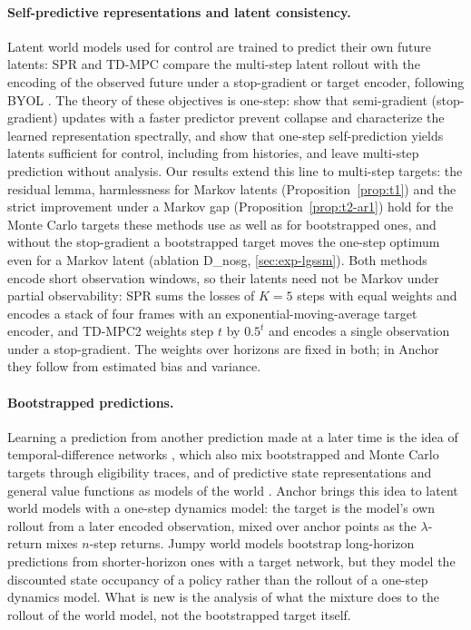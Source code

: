 \paragraph{Self-predictive representations and latent consistency.}
Latent world models used for control are trained to predict their own future latents: SPR \citep{schwarzer2021spr} and TD-MPC \citep{hansen2022tdmpc, hansen2024tdmpc2} compare the multi-step latent rollout with the encoding of the observed future under a stop-gradient or target encoder, following BYOL \citep{grill2020byol}. The theory of these objectives is one-step: \citet{tang2023selfpredictive} show that semi-gradient (stop-gradient) updates with a faster predictor prevent collapse and characterize the learned representation spectrally, and \citet{ni2024bridging} show that one-step self-prediction yields latents sufficient for control, including from histories, and leave multi-step prediction without analysis. Our results extend this line to multi-step targets: the residual lemma, harmlessness for Markov latents (Proposition~\ref{prop:t1}) and the strict improvement under a Markov gap (Proposition~\ref{prop:t2-ar1}) hold for the Monte Carlo targets these methods use as well as for bootstrapped ones, and without the stop-gradient a bootstrapped target moves the one-step optimum even for a Markov latent (ablation D\_nosg, \cref{sec:exp-lgssm}). Both methods encode short observation windows, so their latents need not be Markov under partial observability: SPR sums the losses of $K = 5$ steps with equal weights and encodes a stack of four frames with an exponential-moving-average target encoder, and TD-MPC2 weights step $t$ by $0.5^{t}$ and encodes a single observation under a stop-gradient. The weights over horizons are fixed in both; in Anchor they follow from estimated bias and variance.

\paragraph{Bootstrapped predictions.}
Learning a prediction from another prediction made at a later time is the idea of temporal-difference networks \citep{sutton2004tdnetworks, tanner2005tdlambda}, which also mix bootstrapped and Monte Carlo targets through eligibility traces, and of predictive state representations and general value functions as models of the world \citep{littman2002psr, sutton2011horde}. Anchor brings this idea to latent world models with a one-step dynamics model: the target is the model's own rollout from a later encoded observation, mixed over anchor points as the $\lambda$-return mixes $n$-step returns. Jumpy world models \citep{farebrother2026jumpy} bootstrap long-horizon predictions from shorter-horizon ones with a target network, but they model the discounted state occupancy of a policy rather than the rollout of a one-step dynamics model. What is new is the analysis of what the mixture does to the rollout of the world model, not the bootstrapped target itself.

